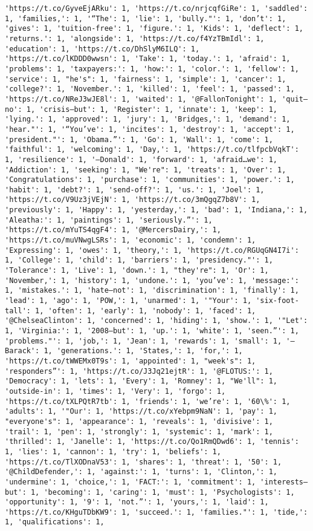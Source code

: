 \documentclass[11pt]{article}
\begin{document}
\begin{Verbatim}[commandchars=\\\{\}]
'https://t.co/GyveEjARku': 1, 'https://t.co/nrjcqfGiRe': 1, 'saddled': 1, 'families,': 1, '“The': 1, 'lie': 1, 'bully."': 1, 'don’t': 1, 'gives': 1, 'tuition-free': 1, 'figure.': 1, 'Kids': 1, 'deflect': 1, 'returns.': 1, 'alongside': 1, 'https://t.co/f4YzTBmIdl': 1, 'education': 1, 'https://t.co/DhSlyM6ILQ': 1, 'https://t.co/lKDDD0wwsn': 1, 'Take': 1, 'today.': 1, 'afraid': 1, 'problems': 1, 'taxpayers:': 1, 'how:': 1, 'color.': 1, 'fellow': 1, 'service': 1, "he's": 1, 'fairness': 1, 'simple': 1, 'cancer': 1, 'college?': 1, 'November.': 1, 'killed': 1, 'feel': 1, 'passed': 1, 'https://t.co/NReJ3wJE8l': 1, 'waited': 1, '@FallonTonight': 1, 'quit—no': 1, 'crisis—but': 1, 'Register': 1, 'innate': 1, 'keep': 1, 'lying.': 1, 'approved': 1, 'jury': 1, 'Bridges,': 1, 'demand': 1, 'hear."': 1, '“You’ve': 1, 'incites': 1, 'destroy': 1, 'accept': 1, 'president."': 1, 'Obama.”': 1, 'Go': 1, 'Wall': 1, 'come': 1, 'faithful': 1, 'welcoming': 1, 'Day,': 1, 'https://t.co/tlfpcbVqkT': 1, 'resilience': 1, '—Donald': 1, 'forward': 1, 'afraid…we': 1, 'Addiction': 1, 'seeking': 1, "We're": 1, 'treats': 1, 'Over': 1, 'Congratulations': 1, 'purchase': 1, 'communities': 1, 'power.': 1, 'habit': 1, 'debt?': 1, 'send-off?': 1, 'us.': 1, 'Joel': 1, 'https://t.co/V9Uz3jVEjN': 1, 'https://t.co/3mQgqZ7b8V': 1, 'previously': 1, 'Happy': 1, 'yesterday,': 1, 'bad': 1, 'Indiana,': 1, 'Aleatha:': 1, 'paintings': 1, 'seriously.”': 1, 'https://t.co/mYuTS4qgF4': 1, '@MercersDairy,': 1, 'https://t.co/muVNwgLSRs': 1, 'economic': 1, 'condemn': 1, 'Expressing': 1, 'owes': 1, 'theory,': 1, 'https://t.co/RGUqGN4I7i': 1, 'College': 1, 'child': 1, 'barriers': 1, 'presidency."': 1, 'Tolerance': 1, 'Live': 1, 'down.': 1, "they're": 1, 'Or': 1, 'November,': 1, 'history': 1, 'undone.': 1, 'you’ve': 1, 'message:': 1, 'mistakes.': 1, 'hate—not': 1, 'discrimination': 1, 'finally': 1, 'lead': 1, 'ago': 1, 'POW,': 1, 'unarmed': 1, '"Your': 1, 'six-foot-tall': 1, 'often': 1, 'early': 1, 'nobody': 1, 'faced': 1, '@ChelseaClinton': 1, 'concerned': 1, 'hiding': 1, 'show.': 1, '"Let': 1, 'Virginia:': 1, '2008—but': 1, 'up.': 1, 'white': 1, 'seen.”': 1, 'problems."': 1, 'job,': 1, 'Jean': 1, 'rewards': 1, 'small': 1, '—Barack': 1, 'generations.': 1, 'States,': 1, 'for,': 1, 'https://t.co/tWWEMx0T9s': 1, 'appointed': 1, "week's": 1, 'responders”': 1, 'https://t.co/J3Jq21ejtR': 1, '@FLOTUS:': 1, 'Democracy': 1, 'lets': 1, 'Every': 1, 'Romney': 1, "We'll": 1, 'outside-in': 1, 'times': 1, 'Very': 1, 'forgo': 1, 'https://t.co/tXLPQtR7tb': 1, 'friends': 1, 'we’re': 1, '60\%': 1, 'adults': 1, '"Our': 1, 'https://t.co/xYebpm9NaN': 1, 'pay': 1, "everyone's": 1, 'appearance': 1, 'reveals': 1, 'divisive': 1, 'trail': 1, 'pen': 1, 'strongly': 1, 'systemic': 1, 'mark': 1, 'thrilled': 1, 'Janelle': 1, 'https://t.co/Qo1RmQDwd6': 1, 'tennis': 1, 'lies': 1, 'cannon': 1, 'try': 1, 'beliefs': 1, 'https://t.co/TlXODnaV53': 1, 'shares': 1, 'threat': 1, '50': 1, '@ChildDefender,': 1, 'against:': 1, 'turns': 1, 'Clinton,': 1, 'undermine': 1, 'choice,': 1, 'FACT:': 1, 'commitment': 1, 'interests—but': 1, 'becoming': 1, 'caring': 1, 'must': 1, 'Psychologists': 1, 'opportunity': 1, '9': 1, 'not.”': 1, 'yours,': 1, 'laid': 1, 'https://t.co/KHguTDbKW9': 1, 'succeed.': 1, 'families."': 1, 'tide,': 1, 'qualifications': 1, 
\end{Verbatim}
\end{document}
